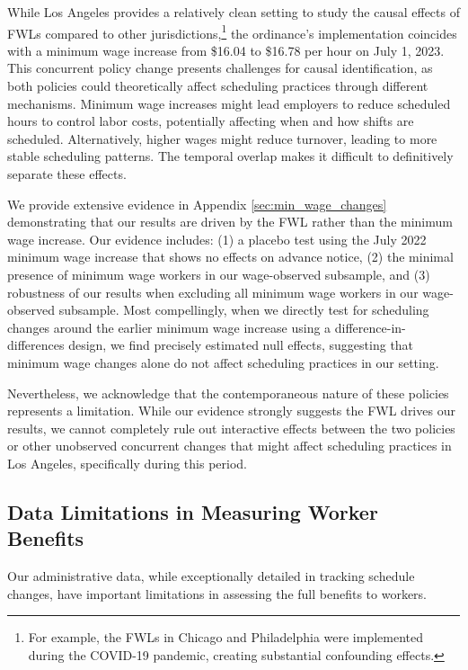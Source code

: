 \documentclass[letterpaper,11pt,leqno]{article}
\theoremstyle{paper}
\begin{document}
While Los Angeles provides a relatively clean setting to study the causal effects of FWLs compared to other jurisdictions,\footnote{For example, the FWLs in Chicago and Philadelphia were implemented during the COVID-19 pandemic, creating substantial confounding effects.} the ordinance's implementation coincides with a minimum wage increase from \$16.04 to \$16.78 per hour on July 1, 2023. This concurrent policy change presents challenges for causal identification, as both policies could theoretically affect scheduling practices through different mechanisms. Minimum wage increases might lead employers to reduce scheduled hours to control labor costs, potentially affecting when and how shifts are scheduled. Alternatively, higher wages might reduce turnover, leading to more stable scheduling patterns. The temporal overlap makes it difficult to definitively separate these effects.

We provide extensive evidence in Appendix \ref{sec:min_wage_changes} demonstrating that our results are driven by the FWL rather than the minimum wage increase. Our evidence includes: (1) a placebo test using the July 2022 minimum wage increase that shows no effects on advance notice, (2) the minimal presence of minimum wage workers in our wage-observed subsample, and (3) robustness of our results when excluding all minimum wage workers in our wage-observed subsample. Most compellingly, when we directly test for scheduling changes around the earlier minimum wage increase using a difference-in-differences design, we find precisely estimated null effects, suggesting that minimum wage changes alone do not affect scheduling practices in our setting.

Nevertheless, we acknowledge that the contemporaneous nature of these policies represents a limitation. While our evidence strongly suggests the FWL drives our results, we cannot completely rule out interactive effects between the two policies or other unobserved concurrent changes that might affect scheduling practices in Los Angeles, specifically during this period.



\subsection{Data Limitations in Measuring Worker Benefits}

Our administrative data, while exceptionally detailed in tracking schedule changes, have important limitations in assessing the full benefits to workers.
\end{document}
